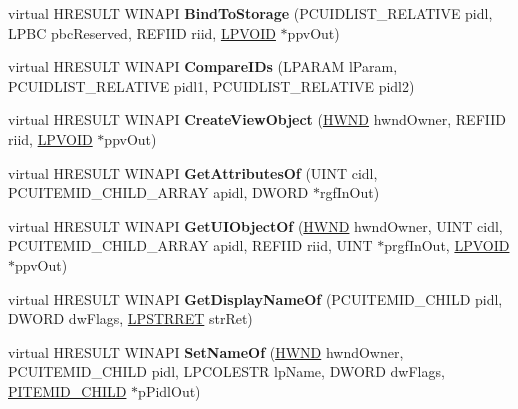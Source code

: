 \begin{DoxyCompactItemize}
virtual H\+R\+E\+S\+U\+LT W\+I\+N\+A\+PI {\bfseries Bind\+To\+Storage} (P\+C\+U\+I\+D\+L\+I\+S\+T\+\_\+\+R\+E\+L\+A\+T\+I\+VE pidl, L\+P\+BC pbc\+Reserved, R\+E\+F\+I\+ID riid, \hyperlink{interfacevoid}{L\+P\+V\+O\+ID} $\ast$ppv\+Out)
\item 
\mbox{\label{class_c_recycle_bin_a755ab955d8e97e85fc741e44fd74e0d2}} 
virtual H\+R\+E\+S\+U\+LT W\+I\+N\+A\+PI {\bfseries Compare\+I\+Ds} (L\+P\+A\+R\+AM l\+Param, P\+C\+U\+I\+D\+L\+I\+S\+T\+\_\+\+R\+E\+L\+A\+T\+I\+VE pidl1, P\+C\+U\+I\+D\+L\+I\+S\+T\+\_\+\+R\+E\+L\+A\+T\+I\+VE pidl2)
\item 
\mbox{\label{class_c_recycle_bin_a0a28f2ef9c54c6009f949d3ee824cda2}} 
virtual H\+R\+E\+S\+U\+LT W\+I\+N\+A\+PI {\bfseries Create\+View\+Object} (\hyperlink{interfacevoid}{H\+W\+ND} hwnd\+Owner, R\+E\+F\+I\+ID riid, \hyperlink{interfacevoid}{L\+P\+V\+O\+ID} $\ast$ppv\+Out)
\item 
\mbox{\label{class_c_recycle_bin_a67b1dec0eba4edb394430107cb8b26dd}} 
virtual H\+R\+E\+S\+U\+LT W\+I\+N\+A\+PI {\bfseries Get\+Attributes\+Of} (U\+I\+NT cidl, P\+C\+U\+I\+T\+E\+M\+I\+D\+\_\+\+C\+H\+I\+L\+D\+\_\+\+A\+R\+R\+AY apidl, D\+W\+O\+RD $\ast$rgf\+In\+Out)
\item 
\mbox{\label{class_c_recycle_bin_a570a593e2a79b436d31c2f7a10c6de48}} 
virtual H\+R\+E\+S\+U\+LT W\+I\+N\+A\+PI {\bfseries Get\+U\+I\+Object\+Of} (\hyperlink{interfacevoid}{H\+W\+ND} hwnd\+Owner, U\+I\+NT cidl, P\+C\+U\+I\+T\+E\+M\+I\+D\+\_\+\+C\+H\+I\+L\+D\+\_\+\+A\+R\+R\+AY apidl, R\+E\+F\+I\+ID riid, U\+I\+NT $\ast$prgf\+In\+Out, \hyperlink{interfacevoid}{L\+P\+V\+O\+ID} $\ast$ppv\+Out)
\item 
\mbox{\label{class_c_recycle_bin_af4a10b45c927bf88a17371018a2f16f0}} 
virtual H\+R\+E\+S\+U\+LT W\+I\+N\+A\+PI {\bfseries Get\+Display\+Name\+Of} (P\+C\+U\+I\+T\+E\+M\+I\+D\+\_\+\+C\+H\+I\+LD pidl, D\+W\+O\+RD dw\+Flags, \hyperlink{struct___s_t_r_r_e_t}{L\+P\+S\+T\+R\+R\+ET} str\+Ret)
\item 
\mbox{\label{class_c_recycle_bin_a0e3b049e7a6299d4852bb057ef9ca6f1}} 
virtual H\+R\+E\+S\+U\+LT W\+I\+N\+A\+PI {\bfseries Set\+Name\+Of} (\hyperlink{interfacevoid}{H\+W\+ND} hwnd\+Owner, P\+C\+U\+I\+T\+E\+M\+I\+D\+\_\+\+C\+H\+I\+LD pidl, L\+P\+C\+O\+L\+E\+S\+TR lp\+Name, D\+W\+O\+RD dw\+Flags, \hyperlink{struct___i_t_e_m_i_d___c_h_i_l_d}{P\+I\+T\+E\+M\+I\+D\+\_\+\+C\+H\+I\+LD} $\ast$p\+Pidl\+Out)

\end{DoxyCompactItemize}
